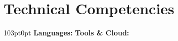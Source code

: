 \section{Technical Competencies}
\begin{adjustwidth}{103pt}{0pt}
    \textbf{Languages:}      \sepbullet
    \textbf{Tools \& Cloud:}     
\end{adjustwidth}